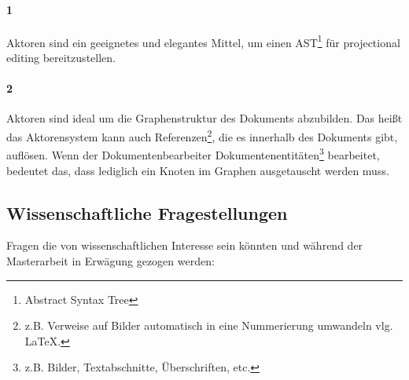 \paragraph{1} Aktoren sind ein geeignetes und elegantes Mittel, um einen AST\footnote{Abstract Syntax Tree}
für projectional editing bereitzustellen.

\paragraph{2} Aktoren sind ideal um die Graphenstruktur des Dokuments
abzubilden. Das heißt das Aktorensystem kann auch Referenzen\footnote{
z.B. Verweise auf Bilder automatisch in eine Nummerierung umwandeln vlg. LaTeX.}, die es innerhalb
des Dokuments gibt, auflösen. Wenn der Dokumentenbearbeiter Dokumentenentitäten\footnote{z.B. Bilder, Textabschnitte, Überschriften, etc.} bearbeitet, bedeutet
das, dass lediglich ein Knoten im Graphen ausgetauscht werden muss.




\subsection{Wissenschaftliche Fragestellungen}

Fragen die von wissenschaftlichen Interesse sein könnten und während der
Masterarbeit in Erwägung gezogen werden:

